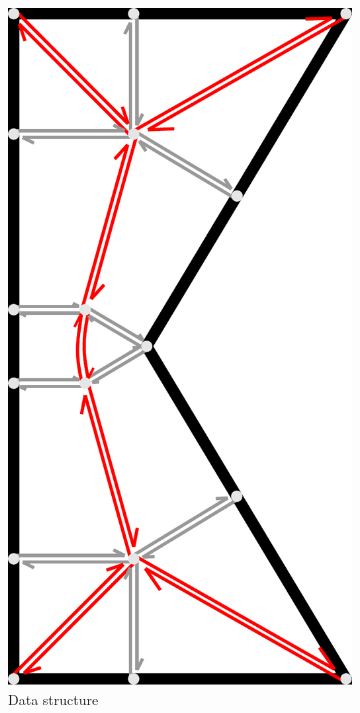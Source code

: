 \begin{figure}
\begin{subfigure}{\figwidth}
\includegraphics[height=\figwidthTwo]{sources/method/half_edge_datastructure.pdf}
\caption{Data structure}\label{shape_decomposition_datastructure}
\end{subfigure}
\begin{subfigure}{\figwidth}\centering

\end{subfigure}
\end{figure}
